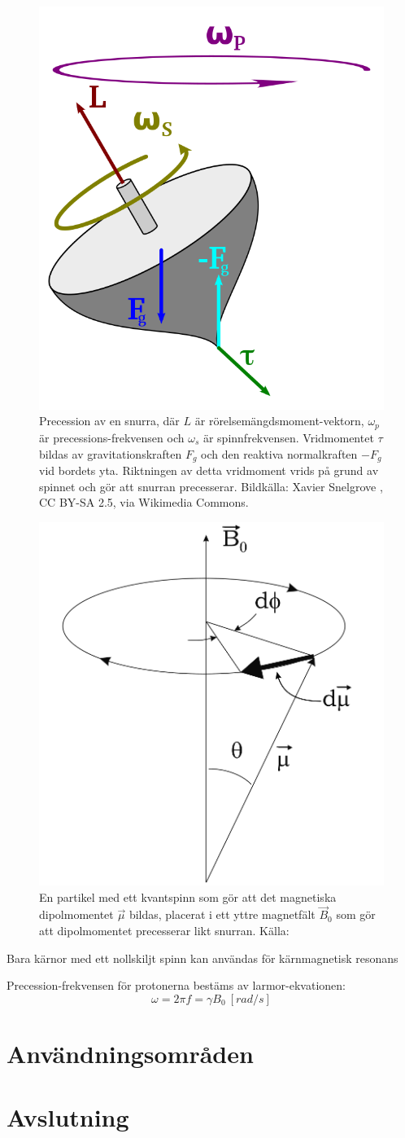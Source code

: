 \documentclass[11pt, a4paper]{article}
\begin{document}
\begin{figure}[hp]
	\centering
	\includegraphics[width=.5\textwidth]{snurra_precession}
	\caption{Precession av en snurra, där $L$ är rörelsemängdsmoment-vektorn, $\omega_p$ är precessions-frekvensen och $\omega_s$ är spinnfrekvensen. Vridmomentet $\tau$ bildas av gravitationskraften $F_g$ och den reaktiva normalkraften $-F_g$ vid bordets yta. Riktningen av detta vridmoment vrids på grund av spinnet och gör att snurran precesserar. Bildkälla: Xavier Snelgrove \parencite*{fig:snurra_precession}, CC BY-SA 2.5, via Wikimedia Commons.}
	\label{fig:snurra_precession}
\end{figure}
\begin{figure}[hp]
	\centering
	\includegraphics[width=.5\textwidth]{magnetic_moment_precession}
	\caption{En partikel med ett kvantspinn som gör att det magnetiska dipolmomentet $\vec\mu$ bildas, placerat i ett yttre magnetfält $\vec B_0$ som gör att dipolmomentet precesserar likt snurran. Källa: \cite{mri_lärobok}}
	\label{fig:magnetiskt_moment_precession}
\end{figure}

Bara kärnor med ett nollskiljt spinn kan användas för kärnmagnetisk resonans

Precession-frekvensen för protonerna bestäms av larmor-ekvationen:
\begin{equation}
	\omega=2\pi f=\gamma B_0\:[\si{rad/s}]
\end{equation}

\clearpage
\section{Användningsområden}


\clearpage
\section{Avslutning}

\clearpage
\printbibliography
\end{document}
